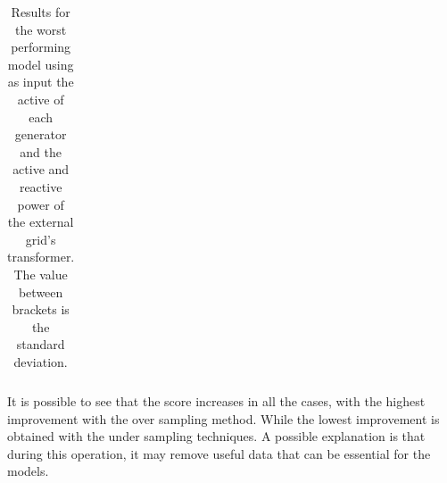 \begin{itemize}
\begin{table}[h]
{\begin{tabular}{|c|c|c|c|c|c|c|c|}
    \end{tabular}%
    }
    \caption[Worst model's results testing some techniques for unbalanced datasets]{Results for the worst performing model using as input the active of each generator and the active and reactive power of the external grid's transformer. The value between brackets is the standard deviation.}
    \end{table}
    \noindent It is possible to see that the score increases in all the cases, with the highest improvement with the over sampling method. While the lowest improvement is obtained with the under sampling techniques. A possible explanation is that during this operation, it may remove useful data that can be essential for the models.
    
    
    \begin{table}[H]
    \centering
\end{table}
\end{itemize}
